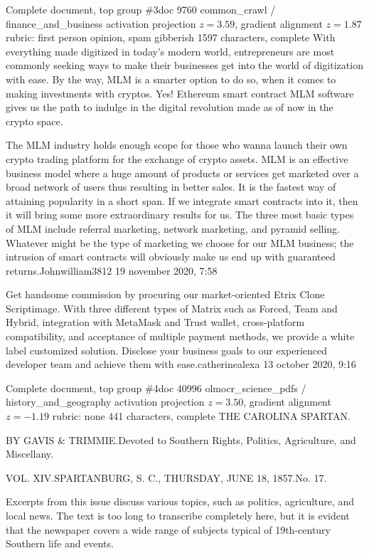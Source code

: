 \begin{docbox}{Complete document, top group \#3}{doc 9760 \textbullet{} common\_crawl / finance\_and\_business \textbullet{} activation projection $z=3.59$, gradient alignment $z=1.87$ \textbullet{} rubric: first person opinion, spam gibberish \textbullet{} 1597 characters, complete}
With everything made digitized in today’s modern world, entrepreneurs are most commonly seeking ways to make their businesses get into the world of digitization with ease. By the way, MLM is a smarter option to do so, when it comes to making investments with cryptos. Yes! Ethereum smart contract MLM software gives us the path to indulge in the digital revolution made as of now in the crypto space.\par The MLM industry holds enough scope for those who wanna launch their own crypto trading platform for the exchange of crypto assets. MLM is an effective business model where a huge amount of products or services get marketed over a broad network of users thus resulting in better sales. It is the fastest way of attaining popularity in a short span. If we integrate smart contracts into it, then it will bring some more extraordinary results for us. The three most basic types of MLM include referral marketing, network marketing, and pyramid selling. Whatever might be the type of marketing we choose for our MLM business; the intrusion of smart contracts will obviously make us end up with guaranteed returns.\newline Johnwilliam3812 19 november 2020, 7:58\par Get handsome commission by procuring our market-oriented Etrix Clone Scriptimage. With three different types of Matrix such as Forced, Team and Hybrid, integration with MetaMask and Trust wallet, cross-platform compatibility, and acceptance of multiple payment methods, we provide a white label customized solution. Disclose your business goals to our experienced developer team and achieve them with ease.\newline catherinealexa 13 october 2020, 9:16
\end{docbox}

\begin{docbox}{Complete document, top group \#4}{doc 40996 \textbullet{} olmocr\_science\_pdfs / history\_and\_geography \textbullet{} activation projection $z=3.50$, gradient alignment $z=-1.19$ \textbullet{} rubric: none \textbullet{} 441 characters, complete}
THE CAROLINA SPARTAN.\par BY GAVIS \& TRIMMIE.\newline Devoted to Southern Rights, Politics, Agriculture, and Miscellany.\par VOL. XIV.\newline SPARTANBURG, S. C., THURSDAY, JUNE 18, 1857.\newline No. 17.\par Excerpts from this issue discuss various topics, such as politics, agriculture, and local news. The text is too long to transcribe completely here, but it is evident that the newspaper covers a wide range of subjects typical of 19th-century Southern life and events.
\end{docbox}

